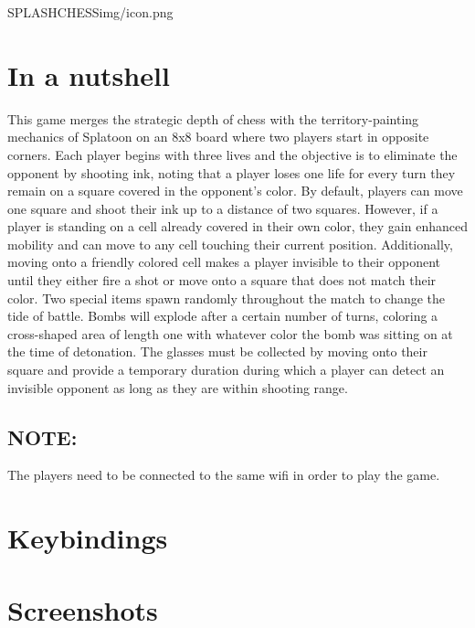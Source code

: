 \documentclass[11pt, a4paper]{article}
\begin{document}
\begin{ManualDocument}{SPLASHCHESS}{img/icon.png}

    \section*{\textcolor{gameOrange}{In a nutshell}}
    \noindent This game merges the strategic depth of chess with the territory-painting mechanics of Splatoon on an 8x8 board where two players start in opposite corners. Each player begins with three lives and the objective is to eliminate the opponent by shooting ink, noting that a player loses one life for every turn they remain on a square covered in the opponent's color. By default, players can move one square and shoot their ink up to a distance of two squares. However, if a player is standing on a cell already covered in their own color, they gain enhanced mobility and can move to any cell touching their current position. Additionally, moving onto a friendly colored cell makes a player invisible to their opponent until they either fire a shot or move onto a square that does not match their color. Two special items spawn randomly throughout the match to change the tide of battle. Bombs will explode after a certain number of turns, coloring a cross-shaped area of length one with whatever color the bomb was sitting on at the time of detonation. The glasses must be collected by moving onto their square and provide a temporary duration during which a player can detect an invisible opponent as long as they are within shooting range.
    
    \subsection*{NOTE:}
    The players need to be connected to the same wifi in order to play the game.

    
    \section*{\textcolor{gameOrange}{Keybindings}}
    


    \section*{\textcolor{gameOrange}{Screenshots}}
    
    
\end{ManualDocument}
\end{document}
